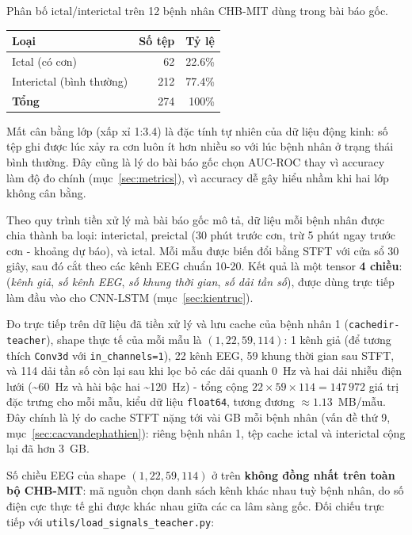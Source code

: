 \begin{table}[H]{Phân bố ictal/interictal trên 12 bệnh nhân CHB-MIT dùng trong bài báo gốc.}
	\label{tab:chbmit-dist}
	\centering
	\begin{tabular}{lrr}
		\toprule
		\textbf{Loại} & \textbf{Số tệp} & \textbf{Tỷ lệ} \\
		\midrule
		Ictal (có cơn)            & 62  & 22.6\% \\
		Interictal (bình thường)  & 212 & 77.4\% \\
		\midrule
		\textbf{Tổng}            & 274 & 100\% \\
		\bottomrule
	\end{tabular}
\end{table}

Mất cân bằng lớp (xấp xỉ 1:3.4) là đặc tính tự nhiên của dữ liệu động kinh: số tệp ghi được lúc
xảy ra cơn luôn ít hơn nhiều so với lúc bệnh nhân ở trạng thái bình thường. Đây cũng là lý do
bài báo gốc chọn AUC-ROC thay vì accuracy làm độ đo chính (mục~\ref{sec:metrics}), vì accuracy
dễ gây hiểu nhầm khi hai lớp không cân bằng.

Theo quy trình tiền xử lý mà bài báo gốc mô tả, dữ liệu mỗi bệnh nhân được chia thành ba loại:
interictal, preictal (30 phút trước cơn, trừ 5 phút ngay trước cơn - khoảng dự báo), và ictal.
Mỗi mẫu được biến đổi bằng STFT với cửa sổ 30 giây, sau đó cắt theo các kênh EEG chuẩn 10-20.
Kết quả là một tensor \textbf{4 chiều}: (\textit{kênh giả}, \textit{số kênh EEG}, \textit{số
khung thời gian}, \textit{số dải tần số}), được dùng trực tiếp làm đầu vào cho CNN-LSTM
(mục~\ref{sec:kientruc}).

Đo trực tiếp trên dữ liệu đã tiền xử lý và lưu cache của bệnh nhân 1 (\texttt{cachedir-teacher}),
shape thực tế của mỗi mẫu là $(1, 22, 59, 114)$: 1 kênh giả (để tương thích \texttt{Conv3d} với
\texttt{in\_channels=1}), 22 kênh EEG, 59 khung thời gian sau STFT, và 114 dải tần số còn lại
sau khi lọc bỏ các dải quanh 0~Hz và hai dải nhiễu điện lưới (\textasciitilde 60~Hz và hài bậc
hai \textasciitilde 120~Hz) - tổng cộng $22 \times 59 \times 114 = 147\,972$ giá trị đặc trưng
cho mỗi mẫu, kiểu dữ liệu \texttt{float64}, tương đương $\approx 1.13$~MB/mẫu. Đây chính là lý
do cache STFT nặng tới vài GB mỗi bệnh nhân (vấn đề thứ 9, mục~\ref{sec:cacvandephathien}): riêng
bệnh nhân 1, tệp cache ictal và interictal cộng lại đã hơn 3~GB.

Số chiều EEG của shape $(1, 22, 59, 114)$ ở trên \textbf{không đồng nhất trên toàn bộ CHB-MIT}:
mã nguồn chọn danh sách kênh khác nhau tuỳ bệnh nhân, do số điện cực thực tế ghi được khác nhau
giữa các ca lâm sàng gốc. Đối chiếu trực tiếp với \texttt{utils/load\_signals\_teacher.py}:


